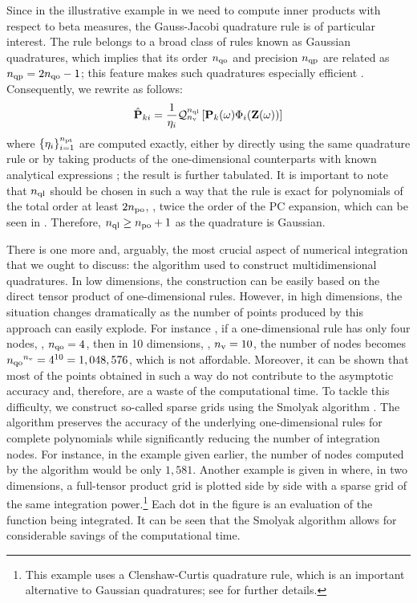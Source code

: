 Since in the illustrative example in  we need to compute inner products with respect to beta measures, the Gauss-Jacobi quadrature rule is of particular interest.
The rule belongs to a broad class of rules known as Gaussian quadratures, which implies that its order ${n_\text{qo}}$ and precision ${n_\text{qp}}$ are related as ${n_\text{qp}} = 2 {n_\text{qo}} - 1$; this feature makes such quadratures especially efficient \cite{heiss2008}.
Consequently, we rewrite  as follows:
\[
  \hat{\mathbf{P}}_{ki} = \frac{1}{\eta_i} \mathcal{Q}_{{n_\text{v}}}^{{n_\text{ql}}}\left[\mathbf{P}_k(\omega) \Phi_i(\mathbf{Z}(\omega))\right]
\]
where $\{ \eta_i \}_{i = 1}^{{n_\text{pt}}}$ are computed exactly, either by directly using the same quadrature rule or by taking products of the one-dimensional counterparts with known analytical expressions \cite{xiu2010}; the result is further tabulated.
It is important to note that ${n_\text{ql}}$ should be chosen in such a way that the rule is exact for polynomials of the total order at least $2 {n_\text{po}}$, \ie, twice the order of the PC expansion, which can be seen in  \cite{eldred2008}.
Therefore, ${n_\text{ql}} \geq {n_\text{po}} + 1$ as the quadrature is Gaussian.

There is one more and, arguably, the most crucial aspect of numerical integration that we ought to discuss: the algorithm used to construct multidimensional quadratures.
In low dimensions, the construction can be easily based on the direct tensor product of one-dimensional rules.
However, in high dimensions, the situation changes dramatically as the number of points produced by this approach can easily explode.
For instance \cite{heiss2008}, if a one-dimensional rule has only four nodes, \ie, ${n_\text{qo}} = 4$, then in 10 dimensions, \ie, ${n_\text{v}} = 10$, the number of nodes becomes ${n_\text{qo}}^{n_\text{v}} = 4^{10} = 1,048,576$, which is not affordable.
Moreover, it can be shown that most of the points obtained in such a way do not contribute to the asymptotic accuracy and, therefore, are a waste of the computational time.
To tackle this difficulty, we construct so-called sparse grids using the Smolyak algorithm \cite{eldred2008, burkardt2013, heiss2008}.
The algorithm preserves the accuracy of the underlying one-dimensional rules for complete polynomials while significantly reducing the number of integration nodes.
For instance, in the example given earlier, the number of nodes computed by the algorithm would be only $1,581$.
Another example is given in  \cite{eldred2008} where, in two dimensions, a full-tensor product grid is plotted side by side with a sparse grid of the same integration power.\footnote{This example uses a Clenshaw-Curtis quadrature rule, which is an important alternative to Gaussian quadratures; see \cite{eldred2008} for further details.}
Each dot in the figure is an evaluation of the function being integrated.
It can be seen that the Smolyak algorithm allows for considerable savings of the computational time.
